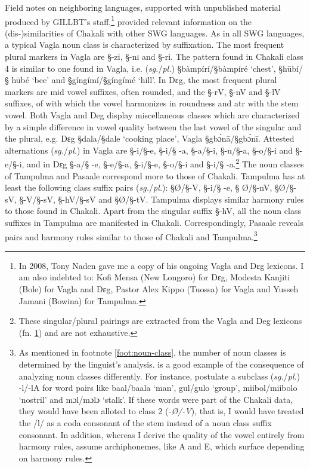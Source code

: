 Field notes on neighboring languages, supported with unpublished
material produced
by GILLBT's staff,\footnote{\label{ft:GRM-naden-donate}In 2008, Tony Naden gave
me  a copy of his ongoing
Vagla and Dɛg lexicons. I am also 
indebted to: Kofi Mensa (New
Longoro) for Dɛg, Modesta
Kanjiti  (Bole) for Vagla and Dɛg, Pastor Alex Kippo (Tuossa) for Vagla and 
Yusseh Jamani (Bowina) for Tampulma.}  provided relevant information on
the
(dis-)similarities of Chakali with other SWG languages. As in all SWG languages,
a typical Vagla noun class is characterized by  suffixation.
The most frequent plural markers in Vagla are {\S -zi}, {\S -nɪ} and
{\S -ri}. The pattern found in Chakali  class 4 is similar to one found in
Vagla, i.e.
({\it sg.}/{\it pl.}) {\S bàmpírí}/{\S bàmpíré} `chest',  {\S hūbí}/{\S
hūbé}  `bee' and   {\S gíngímí}/{\S gíngímé} `hill'.  In Dɛg,   the most
frequent plural markers are mid vowel suffixes, often rounded,  and
the {\S -rV}, {\S -nV} and  {\S -lV} suffixes, of  with which the vowel 
harmonizes
in
roundness and {\sc atr} with the stem vowel. Both Vagla and Deg display 
miscellaneous classes which are characterized by  a simple difference
in vowel quality between the last vowel of the singular and the plural, e.g. Dɛg
{\S dala}/{\S dale} `cooking place',  Vagla  {\S gbɔ́nā}/{\S gbɔ́nī}. Attested
alternations  ({\it sg.}/{\it pl.}) in Vagla are {\S -i}/{\S -e},  {\S -i}/{\S
-a},  {\S -a}/{\S -i}, 
{\S -u}/{\S -a},  {\S -o}/{\S -i} and  {\S -e}/{\S -i},   and in Dɛg {\S -a}/{\S
-e}, {\S -e}/{\S -a}, {\S -i}/{\S -e}, {\S -o}/{\S -i} and  {\S -i}/{\S
-a}.\footnote{These singular/plural pairings are extracted from the Vagla and
Deg lexicons (fn. \ref{ft:GRM-naden-donate}) and are not exhaustive.}  The noun
classes of Tampulma and Pasaale
correspond more to those of Chakali. Tampulma has at least
the
following class suffix pairs ({\it sg.}/{\it pl.}): {\S \O}/{\S -V}, {\S -i}/{\S
-e}, {\S
\O}/{\S -nV},  {\S  \O}/{\S -sV}, {\S  -V}/{\S -sV},  {\S -hV}/{\S -sV} and  
{\S \O}/{\S -tV}.
Tampulma displays similar harmony rules to those found in Chakali. Apart from
the singular suffix {\S -hV}, all the noun class suffixes in Tampulma are
manifested in Chakali.  Correspondingly, Pasaale reveals  pairs and
harmony rules similar to those of Chakali and Tampulma.\footnote{As mentioned in
footnote
\ref{foot:noun-class}, the number of noun classes is determined by the
linguist's analysis.  \citet[5-12]{Mcgi99} is a good example of 
the consequence of analyzing noun classes differently. For instance,  
 \citet[7]{Mcgi99} postulate a subclass  ({\it sg.}/{\it pl.})  {\F -l/-lA} for 
word pairs like {\F baal/baala} `man', {\F gul/gulo} `group', {\F
miibol/miibolo} `nostril' and  {\F mɔl/mɔlɔ} `stalk'. If these words were part
of the
Chakali data, they would have been alloted to class 2 ({\it -\O/-V}), that is,
I would have treated the /l/ as a coda consonant of the stem instead of a noun
class
suffix consonant. In addition, whereas I derive the quality of the vowel
entirely from harmony rules,  \citeauthor{Mcgi99} assume archiphonemes, like A
and E, which surface depending on harmony rules.}

